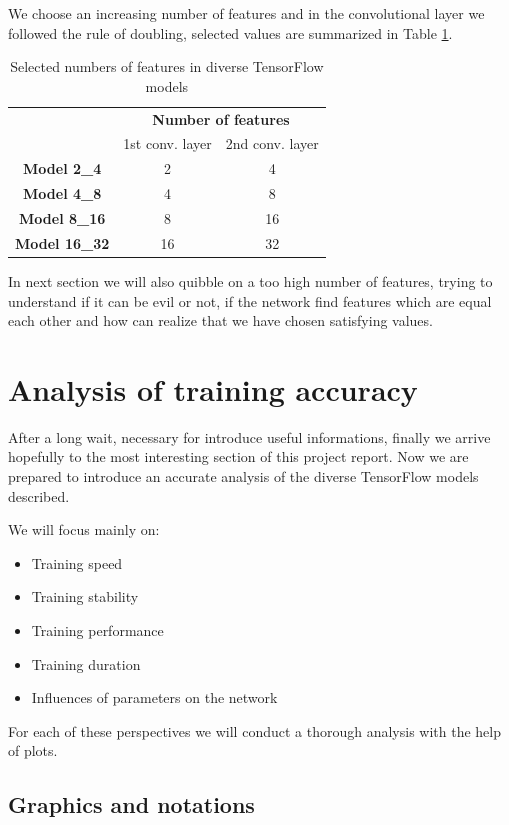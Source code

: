 We choose an increasing number of features and in the convolutional layer we followed the rule of doubling, selected values are summarized in Table \ref{tab:features_number}.

\begin{table}
	\caption{Selected numbers of features in diverse TensorFlow models}
	\label{tab:features_number}
	\centering
	\begin{tabular}{ccc}
		\hline 
		& \multicolumn{2}{c}{\textbf{Number of features}} \\ 
		& 1st conv. layer & 2nd conv. layer \\ 
		\hline 
		\textbf{Model 2\_4} & 2 & 4 \\ 
		\textbf{Model 4\_8} & 4 & 8 \\ 
		\textbf{Model 8\_16} & 8 & 16 \\ 
		\textbf{Model 16\_32} & 16 & 32 \\ 
		\hline 
	\end{tabular}
\end{table}

In next section we will also quibble on a too high number of features, trying to understand if it can be evil or not, if the network find features which are equal each other and how can realize that we have chosen satisfying values.

\section{Analysis of training accuracy}

After a long wait, necessary for introduce useful informations, finally we arrive hopefully to the most interesting section of this project report. Now we are prepared to introduce an accurate analysis of the diverse TensorFlow models described.

We will focus mainly on:
\begin{itemize}
	\item Training speed
	\item Training stability
	\item Training performance
	\item Training duration
	\item Influences of parameters on the network
\end{itemize}

For each of these perspectives we will conduct a thorough analysis with the help of plots.

\subsection{Graphics and notations}

